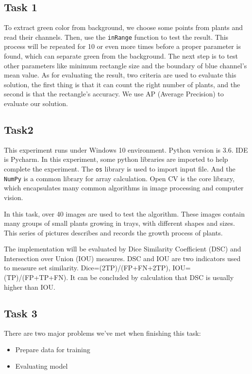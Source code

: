 \documentclass[conference]{IEEEtran}
\begin{document}
\subsection{Task 1}

To extract green color from background, we choose some points from plants and read their channels. Then, use the \verb|inRange| function to test the result. This process will be repeated for 10 or even more times before a proper parameter is found, which can separate green from the background.  The next step is to test other parameters like minimum rectangle size and the boundary of blue channel’s mean value.
As for evaluating the result, two criteria are used to evaluate this solution, the first thing is that it can count the right number of plants, and the second is that the rectangle’s accuracy. We use AP (Average Precision) to evaluate our solution.

\subsection{Task2}

This experiment runs under Windows 10 environment. Python version is 3.6. IDE is Pycharm.
In this experiment, some python libraries are imported to help complete the experiment. The \verb|os| library is used to import input file. And the \verb|NumPy| is a common library for array calculation. Open CV is the core library, which encapsulates many common algorithms in image processing and computer vision. 

In this task, over 40 images are used to test the algorithm. These images contain many groups of small plants growing in trays, with different shapes and sizes. This series of pictures describes and records the growth process of plants.

The implementation will be evaluated by Dice Similarity Coefficient (DSC) and Intersection over Union (IOU) measures. DSC and IOU are two indicators used to measure set similarity. Dice=(2TP)/(FP+FN+2TP), IOU=(TP)/(FP+TP+FN). It can be concluded by calculation that DSC is usually higher than IOU.

\subsection{Task 3}

There are two major problems we've met when finishing this task: 

\begin{itemize}
\item Prepare data for training
\item Evaluating model
\end{itemize}
\end{document}
